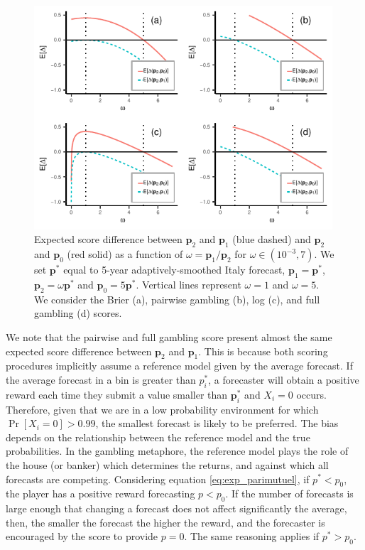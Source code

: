\documentclass[referee,sn-basic]{sn-jnl}
\theoremstyle{thmstyleone}%
\theoremstyle{thmstyletwo}%
\theoremstyle{thmstylethree}%
\begin{document}
\begin{figure}[!htbp]
  \includegraphics[width = 0.99\textwidth]{figure11.pdf}
\caption{Expected score difference between $\mathbf p_2$ and $\mathbf p_1$ (blue dashed) and $\mathbf p_2$ and $\mathbf p_0$ (red solid) as a function of $\omega = \mathbf p_1/\mathbf p_2$ for $\omega \in (10^{-3}, 7)$. We set $\mathbf p^*$ equal to 5-year adaptively-smoothed Italy forecast, $\mathbf p_1 = \mathbf p^*$, $\mathbf p_2 = \omega \mathbf p^*$ and $\mathbf p_0 = 5\mathbf p^*$. Vertical lines represent $\omega = 1$ and $\omega = 5$. We consider the Brier (a), pairwise gambling (b), log (c), and full gambling (d) scores.}
\label{fig:11}
\end{figure}

We note that the pairwise and full gambling score present almost the same expected score difference between $\mathbf p_2$ and $\mathbf p_1$. This is because both scoring procedures implicitly assume a reference model given by the average forecast. If the average forecast in a bin is greater than $p^*_i$, a forecaster will obtain a positive reward each time they submit a value smaller than $\mathbf p^*_i$ and $X_i = 0$ occurs. Therefore, given that we are in a low probability environment for which $\Pr[X_i = 0] > 0.99$, the smallest forecast is likely to be preferred. The bias depends on the relationship between the reference model and the true probabilities. In the gambling metaphore, the reference model plays the role of the house (or banker) which determines the returns, and against which all forecasts are competing. Considering equation \ref{eq:exp_parimutuel}, if $p^* < p_0$, the player has a positive reward forecasting $p < p_0$. If the number of forecasts is large enough that changing a forecast does not affect significantly the average, then, the smaller the forecast the higher the reward, and the forecaster is encouraged by the score to provide $p = 0$. The same reasoning applies if $p^* > p_0$. 
\end{document}
